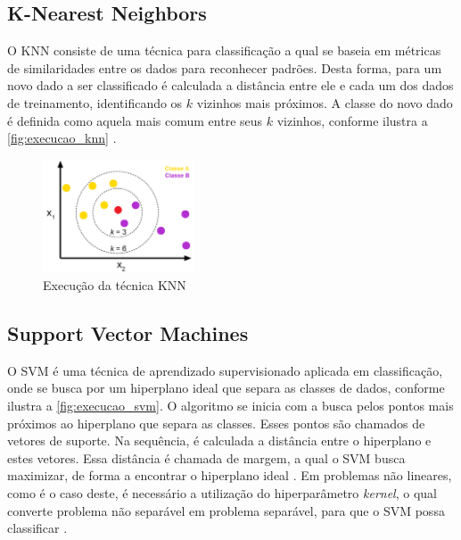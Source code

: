 \subsection{K-Nearest Neighbors}

O KNN consiste de uma técnica para classificação a qual se baseia em métricas de similaridades entre os dados para reconhecer padrões. Desta forma, para um novo dado a ser classificado é calculada a distância entre ele e cada um dos dados de treinamento, identificando os $k$ vizinhos mais próximos. A classe do novo dado é definida como aquela mais comum entre seus $k$ vizinhos, conforme ilustra a \autoref{fig:execucao_knn} \cite{Khandelwal2018}.

\begin{figure}[h]
  \centering
  \caption{Execução da técnica KNN}
   \label{fig:execucao_knn}
   \includegraphics[width=0.4\textwidth]{figuras/fig_6.png}
\end{figure}

\subsection{Support Vector Machines}

O SVM é uma técnica de aprendizado supervisionado aplicada em classificação, onde se busca por um hiperplano ideal que separa as classes de dados, conforme ilustra a \autoref{fig:execucao_svm}. O algoritmo se inicia com a busca pelos pontos mais próximos ao hiperplano que separa as classes. Esses pontos são chamados de vetores de suporte. Na sequência, é calculada a distância entre o hiperplano e estes vetores. Essa distância é chamada de margem, a qual o SVM busca maximizar, de forma a encontrar o hiperplano ideal \cite{Pupale2019}. Em problemas não lineares, como é o caso deste, é necessário a utilização do hiperparâmetro \textit{kernel}, o qual converte problema não separável em problema separável, para que o SVM possa classificar \cite{Shubham2018}.

